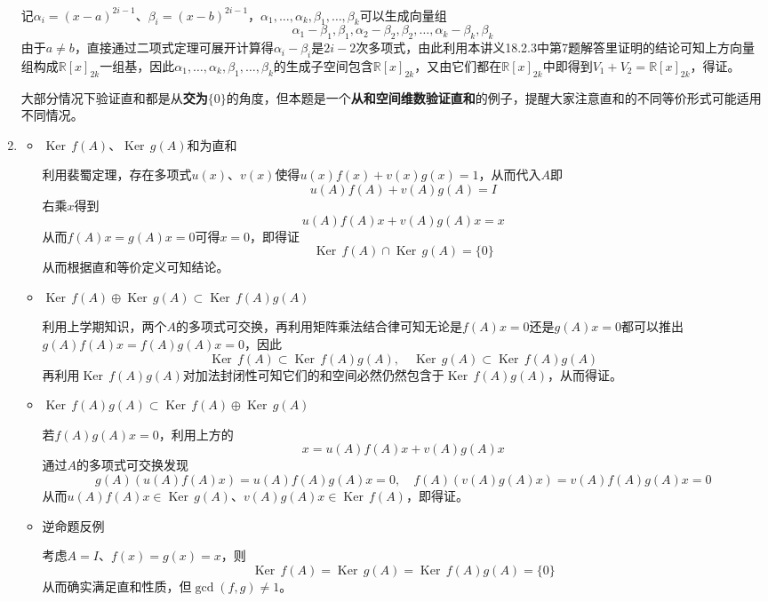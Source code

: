 \documentclass[a4paper,UTF8,fontset=windows,AutoFakeBold]{ctexart}
\DeclareMathOperator{\Ker}{Ker\,}
\newcommand*{\note}{\noindent *}
\begin{document}
\begin{enumerate}
    记$\alpha_i=(x-a)^{2i-1}$、$\beta_i=(x-b)^{2i-1}$，$\alpha_1,\dots,\alpha_k,\beta_1,\dots,\beta_k$可以生成向量组
    $$\alpha_1-\beta_1,\beta_1,\alpha_2-\beta_2,\beta_2,\dots,\alpha_k-\beta_k,\beta_k$$
    由于$a\ne b$，直接通过二项式定理可展开计算得$\alpha_i-\beta_i$是$2i-2$次多项式，由此利用本讲义18.2.3中第7题解答里证明的结论可知上方向量组构成$\mathbb{R}[x]_{2k}$一组基，因此$\alpha_1,\dots,\alpha_k,\beta_1,\dots,\beta_k$的生成子空间包含$\mathbb{R}[x]_{2k}$，又由它们都在$\mathbb{R}[x]_{2k}$中即得到$V_1+V_2=\mathbb{R}[x]_{2k}$，得证。

    \note 大部分情况下验证直和都是从\textbf{交为$\{0\}$}的角度，但本题是一个\textbf{从和空间维数验证直和}的例子，提醒大家注意直和的不同等价形式可能适用不同情况。

    \item
    \begin{itemize}
        \item $\Ker f(A)$、$\Ker g(A)$和为直和
        
        利用裴蜀定理，存在多项式$u(x)$、$v(x)$使得$u(x)f(x)+v(x)g(x)=1$，从而代入$A$即
        $$u(A)f(A)+v(A)g(A)=I$$
        右乘$x$得到
        $$u(A)f(A)x+v(A)g(A)x=x$$
        从而$f(A)x=g(A)x=0$可得$x=0$，即得证
        $$\Ker f(A)\cap\Ker g(A)=\{0\}$$
        从而根据直和等价定义可知结论。

        \item $\Ker f(A)\oplus\Ker g(A)\subset\Ker f(A)g(A)$
        
        利用上学期知识，两个$A$的多项式可交换，再利用矩阵乘法结合律可知无论是$f(A)x=0$还是$g(A)x=0$都可以推出$g(A)f(A)x=f(A)g(A)x=0$，因此
        $$\Ker f(A)\subset\Ker f(A)g(A),\quad\Ker g(A)\subset\Ker f(A)g(A)$$
        再利用$\Ker f(A)g(A)$对加法封闭性可知它们的和空间必然仍然包含于$\Ker f(A)g(A)$，从而得证。 

        \item $\Ker f(A)g(A)\subset\Ker f(A)\oplus\Ker g(A)$
        
        若$f(A)g(A)x=0$，利用上方的
        $$x=u(A)f(A)x+v(A)g(A)x$$
        通过$A$的多项式可交换发现
        $$g(A)(u(A)f(A)x)=u(A)f(A)g(A)x=0,\quad f(A)(v(A)g(A)x)=v(A)f(A)g(A)x=0$$
        从而$u(A)f(A)x\in\Ker g(A)$、$v(A)g(A)x\in\Ker f(A)$，即得证。

        \item 逆命题反例

        考虑$A=I$、$f(x)=g(x)=x$，则
        $$\Ker f(A)=\Ker g(A)=\Ker f(A)g(A)=\{0\}$$
        从而确实满足直和性质，但$\gcd(f,g)\ne1$。


\end{itemize}
\end{enumerate}
\end{document}

